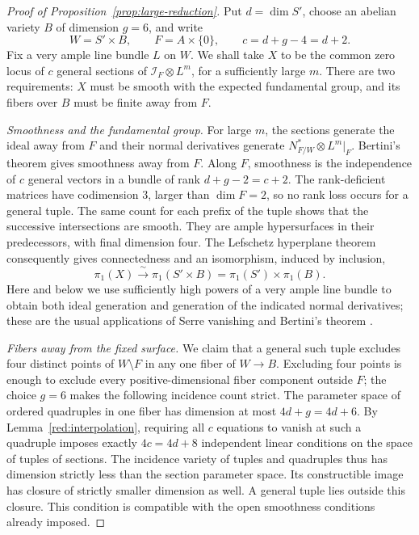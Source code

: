 \documentclass[11pt,reqno]{amsart}
\numberwithin{equation}{section}
\theoremstyle{definition}
\theoremstyle{remark}
\begin{document}
\begin{proof}[Proof of Proposition~\ref{prop:large-reduction}]
Put $d=\dim S'$, choose an abelian variety $B$ of dimension $g=6$, and
write
\[
 W=S'\times B,\qquad F=A\times\{0\},\qquad
 c=d+g-4=d+2.
\]
Fix a very ample line bundle $L$ on $W$.  We shall take $X$ to be the
common zero locus of $c$ general sections of
$\mathcal I_F\otimes L^m$, for a sufficiently large $m$.
There are two requirements: $X$ must be smooth with the expected
fundamental group, and its fibers over $B$ must be finite away from $F$.

 
 \emph{Smoothness and the fundamental group.}
For large $m$, the sections generate the ideal away from $F$ and their
normal derivatives generate
$N^*_{F/W}\otimes L^m|_F$.  Bertini's theorem gives smoothness away
from $F$.  Along $F$, smoothness is the independence of $c$ general
vectors in a bundle of rank $d+g-2=c+2$.  The rank-deficient matrices
have codimension $3$, larger than $\dim F=2$, so no rank loss occurs
for a general tuple.  The same count for each prefix of the tuple
shows that the successive intersections are smooth.  They are ample
hypersurfaces in their predecessors, with final dimension four.
The Lefschetz hyperplane theorem consequently gives connectedness and
an isomorphism, induced by inclusion,
\begin{equation}\label{red:fundamental-group}
 \pi_1(X)\xrightarrow{\ \sim\ }
 \pi_1(S'\times B)=\pi_1(S')\times\pi_1(B).
\end{equation}
Here and below we use sufficiently high powers of a very ample line
bundle to obtain both ideal generation and generation of the indicated
normal derivatives; these are the usual applications of Serre
vanishing and Bertini's theorem \cite{Hartshorne}.

 
 \emph{Fibers away from the fixed surface.}
We claim that a general such tuple excludes four distinct points of
$W\setminus F$ in any one fiber of $W\to B$.  Excluding four points
is enough to exclude every positive-dimensional fiber component
outside $F$; the choice $g=6$ makes the following incidence count
strict.  The parameter space of
ordered quadruples in one fiber has dimension at most $4d+g=4d+6$.
By Lemma~\ref{red:interpolation}, requiring all $c$ equations to
vanish at such a quadruple imposes exactly $4c=4d+8$ independent
linear conditions on the space of tuples of sections.  The incidence
variety of tuples and quadruples thus has dimension strictly less than
the section parameter space.  Its constructible image has closure of
strictly smaller dimension as well.  A general tuple lies outside this
closure.  This condition is compatible with the open smoothness
conditions already imposed.


\end{proof}
\end{document}
